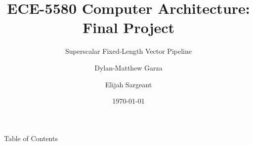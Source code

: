 \documentclass{beamer}
\title[Superscalar Fixed-Length Vector Processor]{ECE-5580 Computer Architecture: Final Project} %
\subtitle{Superscalar Fixed-Length Vector Pipeline} %
\author[Garza et al.]{Dylan-Matthew Garza \and Elijah Sargeant} %
\institute[Western Michigan University]{ %
  Department of Electrical and Computer Engineering \\
  Western Michigan University 
}
\date{\today} %
\begin{document}
\begin{frame}
  \titlepage %
\end{frame}

\begin{frame}{Table of Contents}
  \tableofcontents %
\end{frame}
\end{document}
